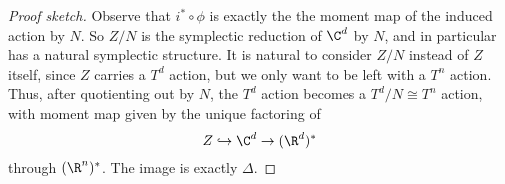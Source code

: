 \documentclass[a4paper]{article}
\begin{document}
\begin{proof}[Proof sketch]
  Observe that $i^* \circ \phi$ is exactly the the moment map of the induced action by $N$. So $Z/N$ is the symplectic reduction of $\C^d$ by $N$, and in particular has a natural symplectic structure. It is natural to consider $Z/N$ instead of $Z$ itself, since $Z$ carries a $T^d$ action, but we only want to be left with a $T^n$ action. Thus, after quotienting out by $N$, the $T^d$ action becomes a $T^d/N \cong T^n$ action, with moment map given by the unique factoring of
  \[
    Z \hookrightarrow \C^d \to (\R^d)^*
  \]
  through $(\R^n)^*$. The image is exactly $\Delta$.
%
%
%

\end{proof}
\end{document}
